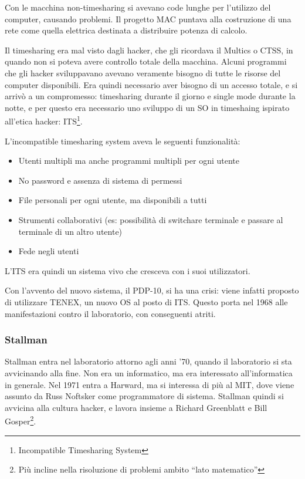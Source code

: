 Con le macchina non-timesharing si avevano code lunghe per l'utilizzo del computer, causando problemi. Il progetto MAC puntava alla costruzione di una rete come quella elettrica destinata a distribuire potenza di calcolo.

Il timesharing era mal visto dagli hacker, che gli ricordava il Multics o CTSS, in quando non si poteva avere controllo totale della macchina. Alcuni programmi che gli hacker sviluppavano avevano veramente bisogno di tutte le risorse del computer disponibili. Era quindi necessario aver bisogno di un accesso totale, e si arriv\`o a un compromesso: timesharing durante il giorno e single mode durante la notte, e per questo era necessario uno sviluppo di un SO in timeshaing ispirato all'etica hacker: ITS\footnote{Incompatible Timesharing System}.

L'incompatible timesharing system aveva le seguenti funzionalit\`a:
\begin{itemize}

\item Utenti multipli ma anche programmi multipli per ogni utente
\item No password e assenza di sistema di permessi
\item File personali per ogni utente, ma disponibili a tutti
\item Strumenti collaborativi (es: possibilit\`a di switchare terminale e passare al terminale di un altro utente)
\item Fede negli utenti

\end{itemize}

L'ITS era quindi un sistema vivo che cresceva  con i suoi utilizzatori.

Con l'avvento del nuovo sistema, il PDP-10, si ha una crisi: viene infatti proposto di utilizzare TENEX, un nuovo OS al posto di ITS. Questo porta nel 1968 alle manifestazioni contro il laboratorio, con conseguenti atriti.

\subsubsection{Stallman}

Stallman entra nel laboratorio attorno agli anni '70, quando il laboratorio si sta avvicinando alla fine. Non era un informatico, ma era interessato all'informatica in generale. Nel 1971 entra a Harward, ma si interessa di pi\`u al MIT, dove viene assunto da Russ Noftsker come programmatore di sistema. Stallman quindi si avvicina alla cultura hacker, e lavora insieme a Richard Greenblatt e Bill Gosper\footnote{Pi\`u incline nella risoluzione di problemi ambito ``lato matematico''}.

